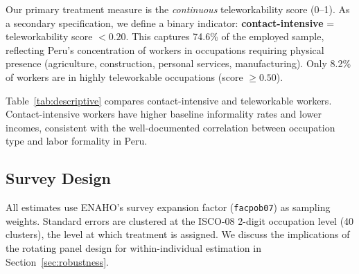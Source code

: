 Our primary treatment measure is the \textit{continuous} teleworkability score (0--1). As a secondary specification, we define a binary indicator: \textbf{contact-intensive} = teleworkability score $< 0.20$. This captures 74.6\% of the employed sample, reflecting Peru's concentration of workers in occupations requiring physical presence (agriculture, construction, personal services, manufacturing). Only 8.2\% of workers are in highly teleworkable occupations (score $\geq 0.50$).

Table~\ref{tab:descriptive} compares contact-intensive and teleworkable workers. Contact-intensive workers have higher baseline informality rates and lower incomes, consistent with the well-documented correlation between occupation type and labor formality in Peru.



\subsection{Survey Design}

All estimates use ENAHO's survey expansion factor (\texttt{facpob07}) as sampling weights. Standard errors are clustered at the ISCO-08 2-digit occupation level (40 clusters), the level at which treatment is assigned. We discuss the implications of the rotating panel design for within-individual estimation in Section~\ref{sec:robustness}.
